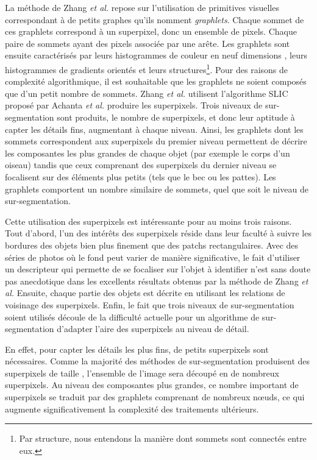 La méthode de Zhang \textit{et al.} \cite{zhang2016detecting} repose sur l'utilisation de primitives visuelles correspondant à de petits graphes qu'ils nomment \emph{graphlets}. Chaque sommet de ces graphlets correspond à un superpixel, donc un ensemble de pixels. Chaque paire de sommets ayant des pixels  associée par une arête. Les graphlets sont ensuite caractérisés par leurs histogrammes de couleur en neuf dimensions \cite{stricker1995similarity}, leurs histogrammes de gradients orientés \cite{dalal2005histograms} et leurs structures\footnote{Par structure, nous entendons la manière dont  sommets sont connectés entre eux.}.  Pour des raisons de complexité algorithmique, il est souhaitable que les graphlets ne soient composés que d'un petit nombre de sommets. Zhang \textit{et al.} utilisent l'algorithme SLIC \cite{zhang2014probabilistic} proposé par Achanta \textit{et al.}  produire les superpixels. Trois niveaux de sur-segmentation sont produits, le nombre de superpixels, et donc leur aptitude à capter les détails fins, augmentant à chaque niveau.  Ainsi, les graphlets dont les sommets correspondent aux superpixels du premier niveau permettent de décrire les composantes les plus grandes de chaque objet (par exemple le corps d'un oiseau) tandis que ceux comprenant des superpixels du dernier niveau se focalisent sur des éléments plus petits (tels que le bec ou les pattes). Les graphlets comportent un nombre similaire de sommets, quel que soit le niveau de sur-segmentation.

Cette utilisation des superpixels est intéressante pour au moins trois raisons. Tout d'abord, l'un des intérêts  des superpixels réside dans leur faculté à suivre les bordures des objets bien plus finement que des patchs rectangulaires. Avec des séries de photos où le fond peut varier de manière significative, le fait d'utiliser un descripteur qui permette de se focaliser sur l'objet à identifier n'est sans doute pas anecdotique dans les excellents résultats obtenus par la méthode de Zhang \textit{et al.} Ensuite, chaque partie des objets est décrite en utilisant les relations de voisinage des superpixels. Enfin, le fait que trois niveaux de sur-segmentation soient utilisés découle de la difficulté actuelle pour un algorithme de sur-segmentation d'adapter l'aire des superpixels au niveau de détail. 

En effet, pour capter les détails les plus fins, de petits superpixels sont nécessaires. Comme la majorité des méthodes de sur-segmentation produisent des superpixels de taille , l'ensemble de l'image sera découpé en de nombreux superpixels. Au niveau des composantes plus grandes, ce nombre important de superpixels se traduit par des graphlets comprenant de nombreux nœuds, ce qui augmente significativement la complexité des traitements ultérieurs. 

